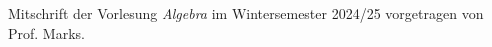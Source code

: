 \documentclass[12pt,a4paper]{article}
\theoremstyle{definition}
\theoremstyle{plain}
\begin{document}
	\setcounter{section}{-1}
	
	
	Mitschrift der Vorlesung \textit{Algebra} im Wintersemester 2024/25 vorgetragen von Prof. Marks. 
	
	\tableofcontents
	
	
	

	
	
	
	
	
	
	
	
	
	
	
	
\end{document}

